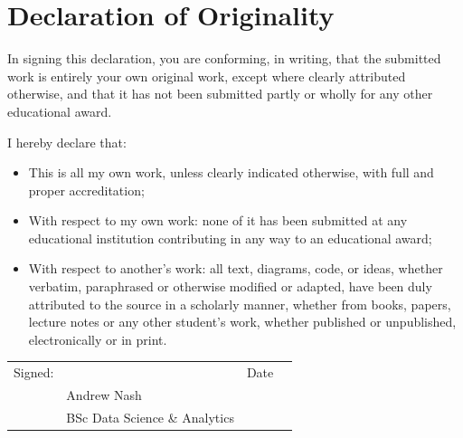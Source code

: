 \documentclass[9pt,conference]{IEEEtran}
\begin{document}
\clearpage

\section*{Declaration of Originality}
In signing this declaration, you are conforming, in writing, that the submitted work is entirely your own original work, except where clearly attributed otherwise, and that it has not been submitted partly or wholly for
any other educational award.

I hereby declare that:

\begin{itemize}
    \item This is all my own work, unless clearly indicated otherwise, with full
and proper accreditation;
    \item With respect to my own work: none of it has been submitted at any educational institution contributing in any way to an educational award;
    \item With respect to another’s work: all text, diagrams, code, or ideas, whether verbatim, paraphrased or otherwise modified or adapted, have been duly attributed to the source in a scholarly manner, whether
from books, papers, lecture notes or any other student’s work, whether published or unpublished, electronically or in print.
\end{itemize}

\vspace{5cm}

\begin{tabular}{@{}p{.5in}p{2in}p{.5in}p{2in}@{}}
Signed: & \hrulefill  & Date &  \hrulefill  \\
& Andrew Nash & &\\
& BSc Data Science \& Analytics & &\\
\end{tabular}
\end{document}
